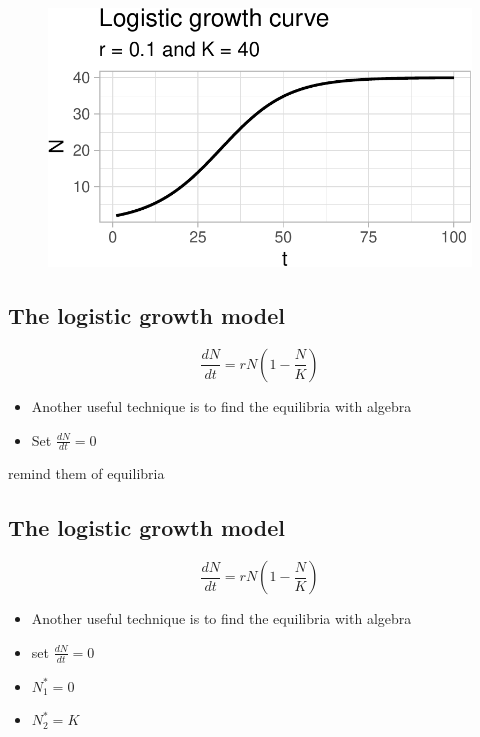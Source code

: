\documentclass[
  letterpaper,
  DIV=11,
  numbers=noendperiod]{scrartcl}
\begin{document}
\begin{figure}[H]

{\centering \includegraphics{ecological_interactions_files/figure-pdf/unnamed-chunk-8-1.pdf}

}

\end{figure}

\hypertarget{the-logistic-growth-model-8}{%
\subsection{The logistic growth
model}\label{the-logistic-growth-model-8}}

\[\frac{dN}{dt}=rN(1-\frac{N}{K})\]

\begin{itemize}
\item
  Another useful technique is to find the equilibria with algebra
\item
  Set \(\frac{dN}{dt}=0\)
\end{itemize}

remind them of equilibria

\hypertarget{the-logistic-growth-model-9}{%
\subsection{The logistic growth
model}\label{the-logistic-growth-model-9}}

\[\frac{dN}{dt}=rN(1-\frac{N}{K})\]

\begin{itemize}
\item
  Another useful technique is to find the equilibria with algebra
\item
  set \(\frac{dN}{dt}=0\)
\item
  \(N_1^*=0\)
\item
  \(N_2^*=K\)
\end{itemize}
\end{document}
